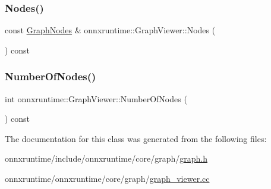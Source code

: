 \mbox{\label{classonnxruntime_1_1GraphViewer_ab4f10284fb8bee8eae31bbeb8197fd63}} 
\subsubsection{\texorpdfstring{Nodes()}{Nodes()}}
{\footnotesize\ttfamily const \mbox{\hyperlink{classonnxruntime_1_1GraphNodes}{Graph\+Nodes}} \& onnxruntime\+::\+Graph\+Viewer\+::\+Nodes (\begin{DoxyParamCaption}{ }\end{DoxyParamCaption}) const\hspace{0.3cm}{\ttfamily [noexcept]}}

\mbox{\label{classonnxruntime_1_1GraphViewer_aecfc743ec5d8e4a5209b7a43b32c8e1d}} 
\subsubsection{\texorpdfstring{Number\+Of\+Nodes()}{NumberOfNodes()}}
{\footnotesize\ttfamily int onnxruntime\+::\+Graph\+Viewer\+::\+Number\+Of\+Nodes (\begin{DoxyParamCaption}{ }\end{DoxyParamCaption}) const\hspace{0.3cm}{\ttfamily [noexcept]}}



The documentation for this class was generated from the following files\+:\begin{DoxyCompactItemize}
\item 
onnxruntime/include/onnxruntime/core/graph/\mbox{\hyperlink{graph_8h}{graph.\+h}}\item 
onnxruntime/onnxruntime/core/graph/\mbox{\hyperlink{graph__viewer_8cc}{graph\+\_\+viewer.\+cc}}\end{DoxyCompactItemize}
